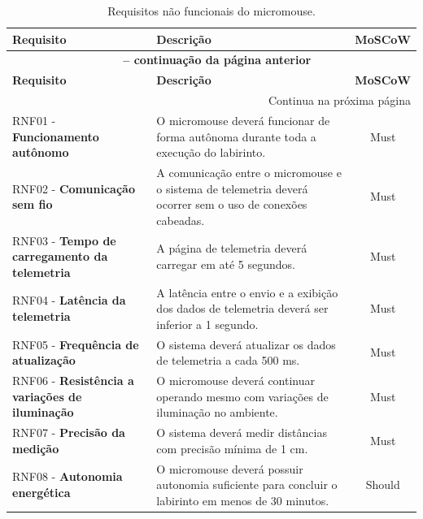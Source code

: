     \begin{center}
    \begin{longtable}{|p{5.5cm}|p{8cm}|c|}
    \caption{Requisitos não funcionais do micromouse.} \label{tab:rnf} \\
    \hline
    \textbf{Requisito} & \textbf{Descrição} & \textbf{MoSCoW} \\ \hline
    \endfirsthead
    \multicolumn{3}{c}{{\bfseries \tablename\ \thetable{} -- continuação da página anterior}} \\
    \hline
    \textbf{Requisito} & \textbf{Descrição} & \textbf{MoSCoW} \\ \hline
    \endhead
    \hline \multicolumn{3}{r}{{Continua na próxima página}} \\ \endfoot
    \hline \endlastfoot

    RNF01 - \textbf{Funcionamento autônomo} & O micromouse deverá funcionar de forma autônoma durante toda a execução do labirinto. & Must \\ \hline

    RNF02 - \textbf{Comunicação sem fio} & A comunicação entre o micromouse e o sistema de telemetria deverá ocorrer sem o uso de conexões cabeadas. & Must \\ \hline

    RNF03 - \textbf{Tempo de carregamento da telemetria} & A página de telemetria deverá carregar em até 5 segundos. & Must \\ \hline

    RNF04 - \textbf{Latência da telemetria} & A latência entre o envio e a exibição dos dados de telemetria deverá ser inferior a 1 segundo. & Must \\ \hline

    RNF05 - \textbf{Frequência de atualização} & O sistema deverá atualizar os dados de telemetria a cada 500 ms. & Must \\ \hline

    RNF06 - \textbf{Resistência a variações de iluminação} & O micromouse deverá continuar operando mesmo com variações de iluminação no ambiente. & Must \\ \hline

    RNF07 - \textbf{Precisão da medição} & O sistema deverá medir distâncias com precisão mínima de 1 cm. & Must \\ \hline

    RNF08 - \textbf{Autonomia energética} & O micromouse deverá possuir autonomia suficiente para concluir o labirinto em menos de 30 minutos. & Should \\ \hline


\end{longtable}
\end{center}
